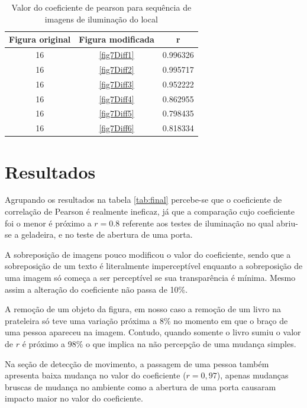 \documentclass[10pt,a4paper]{article}
\begin{document}
\begin{table}[h!]
  \begin{center}
    \caption{Valor do coeficiente de pearson para sequência de imagens
      de iluminação do local}
    \begin{tabular}{|c|c|c|}
      \hline
      Figura original & Figura modificada & r\\
      \hline
      16 &  \ref{fig7Diff1} & 0.996326\\
      16 &  \ref{fig7Diff2} & 0.995717\\
      16 &  \ref{fig7Diff3} & 0.952222\\
      16 &  \ref{fig7Diff4} & 0.862955\\
      16 &  \ref{fig7Diff5} & 0.798435\\
      16 &  \ref{fig7Diff6} &  0.818334\\
      \hline
    \end{tabular}
  \end{center}
\end{table}
\newpage
\section{Resultados}
Agrupando os resultados na tabela \ref{tab:final} percebe-se que o
coeficiente de correlação de Pearson é realmente ineficaz, já que a
comparação cujo coeficiente foi o menor é próximo a $r=0.8$ referente
aos testes de iluminação no qual abriu-se a geladeira, e no teste de
abertura de uma porta.

A sobreposição de imagens pouco modificou o valor do coeficiente,
sendo que a sobreposição de um texto é literalmente imperceptível
enquanto a sobreposição de uma imagem só começa a ser perceptível se
sua transparência é mínima. Mesmo assim a alteração do coeficiente não
passa de 10\%.

A remoção de um objeto da figura, em nosso caso a remoção de um livro
na prateleira só teve uma variação próxima a 8\% no momento em que o
braço de uma pessoa apareceu na imagem. Contudo, quando somente o
livro sumiu o valor de $r$ é próximo a 98\% o que implica na não
percepção de uma mudança simples.

Na seção de detecção de movimento, a passagem de uma pessoa também
apresenta baixa mudança no valor do coeficiente ($r=0,97$), apenas
mudanças bruscas de mudança no ambiente como a abertura de uma porta
causaram impacto maior no valor do coeficiente.
\end{document}
